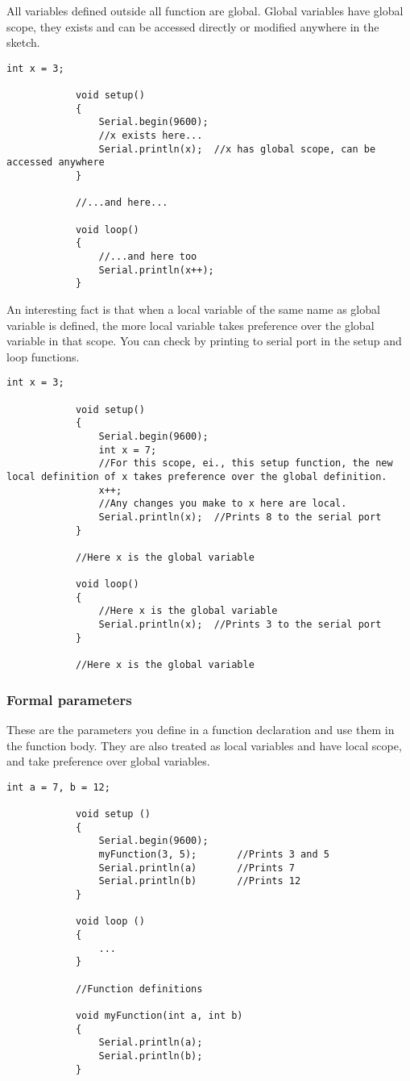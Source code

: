 \documentclass{article}
\begin{document}
			All variables defined outside all function are global. Global variables have global scope, they exists and can be accessed directly or modified anywhere in the sketch.

			\begin{lstlisting}[gobble=12]
			int x = 3;

			void setup()
			{
				Serial.begin(9600);
				//x exists here...
				Serial.println(x);	//x has global scope, can be accessed anywhere
			}

			//...and here...

			void loop()
			{
				//...and here too
				Serial.println(x++);
			}
			\end{lstlisting}

			An interesting fact is that when a local variable of the same name as global variable is defined, the more local variable takes preference over the global variable in that scope. You can check by printing  to serial port in the setup and loop functions.

			\begin{lstlisting}[gobble=12]
			int x = 3;

			void setup()
			{
				Serial.begin(9600);
				int x = 7;
				//For this scope, ei., this setup function, the new local definition of x takes preference over the global definition.
				x++;
				//Any changes you make to x here are local.
				Serial.println(x);	//Prints 8 to the serial port
			}

			//Here x is the global variable

			void loop()
			{
				//Here x is the global variable
				Serial.println(x);	//Prints 3 to the serial port
			}

			//Here x is the global variable
			\end{lstlisting}

		\subsubsection{Formal parameters}

			These are the parameters you define in a function declaration and use them in the function body. They are also treated as local variables and have local scope, and take preference over global variables.

			\begin{lstlisting}[gobble=12]
			int a = 7, b = 12;

			void setup ()
			{
				Serial.begin(9600);
				myFunction(3, 5);		//Prints 3 and 5
				Serial.println(a)		//Prints 7
				Serial.println(b)		//Prints 12
			}

			void loop ()
			{
				...
			}

			//Function definitions

			void myFunction(int a, int b)
			{
				Serial.println(a);
				Serial.println(b);
			}

			
			\end{lstlisting}
				
\end{document}
